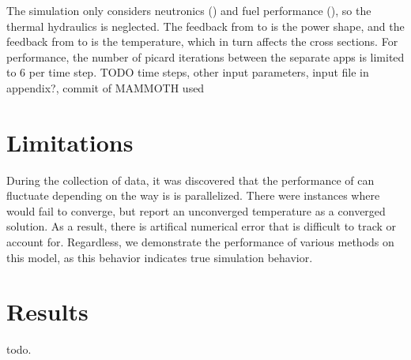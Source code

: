 The simulation only considers neutronics (\rattlesnake{}) and fuel performance (\bison{}), so the thermal hydraulics is neglected.
The feedback from \rattlesnake{} to \bison{} is the power shape, and the feedback from \bison{} to \rattlesnake{} is the
temperature, which in turn affects the cross sections.  For performance, the number of picard iterations between the separate apps
is limited to 6 per time step.  TODO time steps, other input parameters, input file in appendix?, commit of MAMMOTH used

\section{Limitations}
During the collection of data, it was discovered that the performance of \bison{} can fluctuate depending on
the way is is parallelized.  There were instances where \bison{} would fail to converge, but report an unconverged
temperature as a converged solution.  As a result, there is artifical numerical error that is difficult to track or
account for.  Regardless, we demonstrate the performance of various methods on this model, as this behavior indicates
true simulation behavior.

\section{Results}

todo.

%
%
%
